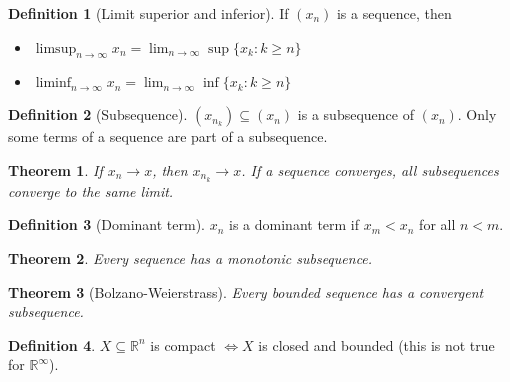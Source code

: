 \documentclass{article}
\newcommand{\limn}{\lim_{n \to \infty}}
\theoremstyle{definition}
\newtheorem{definition}{Definition}[section]
\theoremstyle{definition}
\theoremstyle{plain}
\newtheorem{theorem}{Theorem}[section]
\theoremstyle{plain}
\theoremstyle{plain}
\theoremstyle{plain}
\theoremstyle{definition}
\theoremstyle{remark}
\theoremstyle{remark}
\theoremstyle{remark}
\theoremstyle{remark}
\newcommand{\R}{\mathbb{R}}
\begin{document}
\begin{definition}[Limit superior and inferior]
  If $(x_n)$ is a sequence, then
  \begin{itemize}
    \item $\limsup_{n \to \infty} x_n = \limn \sup\{x_k : k \geq n\}$
    \item $\liminf_{n \to \infty} x_n = \limn \inf\{x_k : k \geq n\}$
  \end{itemize}
\end{definition}



\begin{definition}[Subsequence]
  $(x_{n_k}) \subseteq (x_n)$ is a subsequence of $(x_n)$. Only some terms of a sequence are part of a subsequence.
\end{definition}



\begin{theorem}
  If $x_n \to x$, then $x_{n_k} \to x$. If a sequence converges, all subsequences converge to the same limit.
\end{theorem}



\begin{definition}[Dominant term]
  $x_n$ is a dominant term if $x_m < x_n$ for all $n < m$.
\end{definition}


\begin{theorem}
  Every sequence has a monotonic subsequence.
\end{theorem}



\begin{theorem}[Bolzano-Weierstrass]
  Every bounded sequence has a convergent subsequence.
\end{theorem}



\begin{definition}
  $X \subseteq \R^n$ is compact $\iff X$ is closed and bounded (this is not true for $\R^\infty$).
\end{definition}


\end{document}
